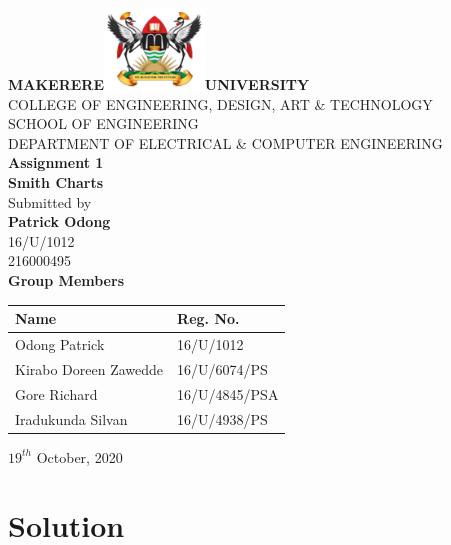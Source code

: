 \documentclass[12pt,a4paper,openright]{report}
\begin{document}
		\begin{titlepage}
			
			\begin{center}
				\Huge{\textbf{MAKERERE}}\includegraphics[width=0.2\textwidth]{logo.png}\Huge{\textbf{UNIVERSITY}}\\[0.5in]
				\Large
				COLLEGE OF ENGINEERING, DESIGN, ART \& TECHNOLOGY\\[0.3in]
				SCHOOL OF ENGINEERING\\[0.3in]
				\large{DEPARTMENT OF ELECTRICAL \& COMPUTER ENGINEERING} \\[.5in]
				
				\Large \textbf {Assignment 1}\\[.3in]
				\Large \textbf {Smith Charts}\\[.5in]
				
				
				
				\normalsize Submitted by \\[0.2in]
				\textbf{Patrick Odong}\\
				16/U/1012\\
				216000495\\
				
				\vspace{.5in}
				\Large \textbf {Group Members}\\[.1in]
				
				\begin{table}[H]
					\begin{center}
						\begin{tabular}{|l|l|}
							\hline
							Name & Reg. No.\\ \hline
							Odong Patrick & 16/U/1012 \\ \hline
							Kirabo Doreen Zawedde & 16/U/6074/PS \\ \hline
							Gore Richard & 16/U/4845/PSA \\ \hline
							Iradukunda Silvan & 16/U/4938/PS \\ \hline
						\end{tabular}
					\end{center}
				\end{table}
				
				
				\vfill
				\normalsize
				$19^{th}$ October, 2020
				
				
				
			\end{center}
			
		\end{titlepage}
	\noindent \section*{Solution}
	
\end{document}
